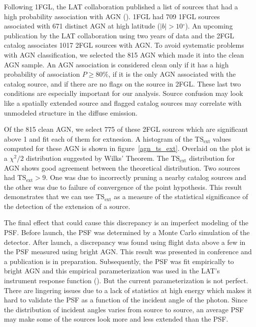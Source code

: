 \documentclass[12pt,preprint]{aastex}
\newcommand{\gev}{\text{GeV}\xspace}
\newcommand{\tsext}{{\ensuremath{\text{TS}_\text{ext}}}\xspace}
\renewcommand{\deg}{\ensuremath{^\circ}\xspace}
\begin{document}
Following 1FGL, the LAT collaboration published a list of sources that
had a high probability association with AGN (\cite{first_agn_cat}).
1FGL had 709 1FGL sources associated with 671 distinct AGN at high
latitude ($|b|>10\deg$).  An upcoming publication by the LAT collaboration
using two years of data and the 2FGL catalog associates 1017 2FGL sources
with AGN.  To avoid systematic problems with AGN classification, we
selected the 815 AGN which made it into the clean AGN sample.  An AGN
association is considered clean only if it has a high probability
of association $P\ge 80\%$, if it is the only AGN associated with the
catalog source, and if there are no flags on the source in 2FGL. These
last two conditions are especially important for our analysis. Source
confusion may look like a spatially extended source and flagged catalog
sources may correlate with unmodeled structure in the diffuse emission.

Of the 815 clean AGN, we select 775 of these 2FGL sources which
are significant above 1 \gev and fit each of them for extnesion.
A histogram of the \tsext values computed for these AGN is shown
in figure~\ref{agn_ts_ext}. Overlaid on the plot is a $\chi^2/2$
distribution suggested by Wilks' Theorem.  The \tsext distribution
for AGN shows good agreement between the theoretical distribution.
Two sources had $\tsext>9$.  One was due to incorrectly
    pruning a nearby catalog sources and the other was due to failure
    of convergence of the point hypothesis.
This result demonstrates that we can use \tsext as a measure of the
statistical significance of the detection of the extension of a source.

The final effect that could cause this discrepancy is an imperfect
modeling of the PSF.  Before launch, the PSF was determined by a Monte
Carlo simulation of the detector.  After launch, a discrepancy was found
using flight data above a few \gev in the PSF measured using bright
AGN.  This result was presented in conference and a publication is in
preparation.  Subsequently, the PSF was fit empirically to bright AGN and
this empirical parameterization was used in the LAT's instrument response
function (\cite{lat_on_orbit_psf}).  But the current parameterization
is not perfect. There are lingering issues due to a lack of statistics
at high energy which makes it hard to validate the PSF as a function of
the incident angle of the photon. Since the distribution of incident
angles varies from source to source, an average PSF may make some of
the sources look more and less extended than the PSF.
\end{document}

